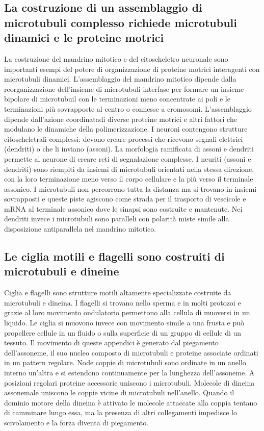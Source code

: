 \subsection{La costruzione di un assemblaggio di microtubuli complesso richiede microtubuli dinamici e le proteine motrici}
La costruzione del mandrino mitotico e del citoscheletro neuronale sono importanti esempi del potere di organizzazione di proteine motrici interagenti con microtubuli dinamici. 
L'assemblaggio del mandrino mitotico dipende dalla reorganizzazione dell'insieme di microtubuli interfase per formare un insieme bipolare di microtubuil con le terminazioni meno 
concentrate ai poli e le terminazioni pi\`u sovrapposte al centro o connesse a cromosomi. L'assemblaggio dipende dall'azione coordinatadi diverse proteine motrici e altri fattori che 
modulano le dinamiche della polimerizzazione. I neuroni contengono strutture citoscheletrali complessi: devono creare processi che ricevono segnali elettrici (dendriti) o che li
inviano (assoni). La morfologia ramificata di assoni e dendriti permette al neurone di creare reti di segnalazione complesse. I neuriti (assoni e dendriti) sono riempiti da insiemi 
di microtubuli orientati nella stessa direzione, con la loro terminazione meno verso il corpo cellulare e la pi\`u verso il terminale assonico. I microtubuli non percorrono tutta
la distanza ma si trovano in insiemi sovrapposti e queste piste agiscono come strada per il trasporto di vescicole e mRNA al terminale assonico dove le sinapsi sono costruite e 
mantenute. Nei dendriti invece i microtubuli sono paralleli con polarit\`a miste simile alla disposizione antiparallela nel mandrino mitotico.
\subsection{Le ciglia motili e flagelli sono costruiti di microtubuli e dineine}
Ciglia e flagelli sono strutture motili altamente specializzate costruite da microtubuli e dineina. I flagelli si trovano nello sperma e in molti protozoi e grazie al loro movimento
ondulatorio permettono alla cellula di muoversi in un liquido. Le ciglia si muovono invece con movimento simile a una frusta e pu\`o propellere cellule in un fluido o sulla superficie
di un gruppo di cellule di un tessuto. Il movimento di queste appendici \`e generato dal piegamento dell'assoneme, il suo nucleo composto di microtubuli e proteine associate ordinati
in un pattern regolare. Node coppie di microtubuli sono ordinate in un anello interno un'altra e si estendono continuamente per la lunghezza dell'assoneme. A posizioni regolari 
proteine accessorie uniscono i microtubuli. Molecole di dineina assonemale uniscono le coppie vicine di microtubuli nell'anello. Quando il dominio motore della dineina \`e attivato
le molecole attaccate alla coppia tentano di camminare lungo essa, ma la presenza di altri collegamenti impedisce lo scivolamento e la forza diventa di piegamento. 
